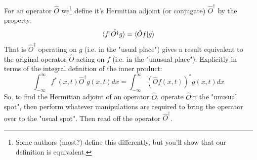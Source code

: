 \documentclass[12pt]{book}
\begin{document}
For an operator $\hat{O}$ we\footnote{Some authors (most?) define this differently, but you'll show that our definition is equivalent.} define it's Hermitian adjoint (or conjugate) $\hat{O}^\dagger$ by the property:
\begin{equation}
\braket{f|\hat{O^\dagger}g} = \braket{\hat{O} f| g}
\end{equation}
That is $\hat{O}^\dagger$ operating on $g$ (i.e. in the "usual place") gives a result equivalent to the original operator $\hat{O}$ acting on $f$ (i.e. in the "unusual place").  Explicitly in terms of the integral definition of the inner product:
\begin{equation}
\int_{-\infty}^{\infty} f^*(x,t)\hat{O}^\dagger g(x,t) dx = 
\int_{-\infty}^{\infty} \left( \hat{O} f(x,t)\right)^* g(x,t) dx
\end{equation}
So, to find the Hermitian adjoint of an operator $\hat{O}$, operate $\hat{O}$in the "unusual spot", then perform whatever manipulations are required to bring the operator over to the "usual spot".  Then read off the operator $\hat{O}^\dagger$.
\end{document}
